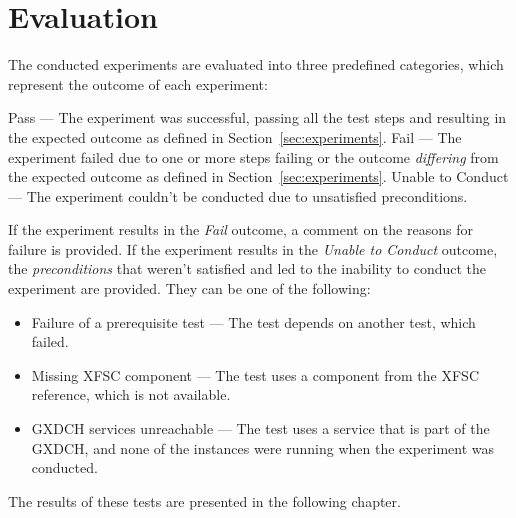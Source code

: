 \section{Evaluation}\label{sec:evaluation}

The conducted experiments are evaluated into three predefined categories, which represent the outcome of each experiment:

Pass --- The experiment was successful, passing all the test steps and resulting in the expected outcome as defined in Section~\ref{sec:experiments}.
Fail --- The experiment failed due to one or more steps failing or the outcome \textit{differing} from the expected outcome as defined in Section~\ref{sec:experiments}.
Unable to Conduct --- The experiment couldn't be conducted due to unsatisfied preconditions.

If the experiment results in the \textit{Fail} outcome, a comment on the reasons for failure is provided.
If the experiment results in the \textit{Unable to Conduct} outcome, the \textit{preconditions} that weren't satisfied and led to the inability to conduct the experiment are provided.
They can be one of the following:
\begin{itemize}
    \item Failure of a prerequisite test --- The test depends on another test, which failed.
    \item Missing XFSC component --- The test uses a component from the XFSC reference, which is not available.
    \item GXDCH services unreachable --- The test uses a service that is part of the GXDCH, and none of the instances were running when the experiment was conducted.
\end{itemize}

The results of these tests are presented in the following chapter.
